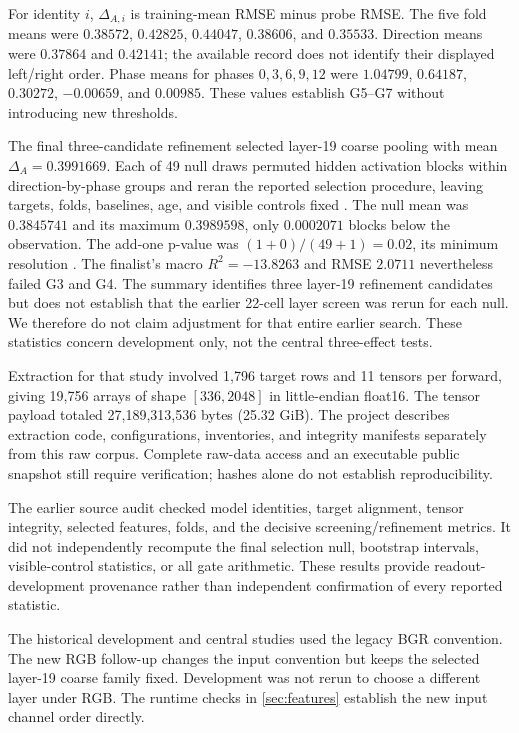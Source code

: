 \documentclass{article}
\begin{document}
For identity $i$, $\Delta_{A,i}$ is training-mean RMSE minus probe RMSE. The five fold means were $0.38572$, $0.42825$, $0.44047$, $0.38606$, and $0.35533$. Direction means were $0.37864$ and $0.42141$; the available record does not identify their displayed left/right order. Phase means for phases $0,3,6,9,12$ were $1.04799$, $0.64187$, $0.30272$, $-0.00659$, and $0.00985$. These values establish G5--G7 without introducing new thresholds.

The final three-candidate refinement selected layer-19 coarse pooling with mean $\Delta_A=0.3991669$. Each of 49 null draws permuted hidden activation blocks within direction-by-phase groups and reran the reported selection procedure, leaving targets, folds, baselines, age, and visible controls fixed \citep{ojala2010permutation}. The null mean was $0.3845741$ and its maximum $0.3989598$, only $0.0002071$ blocks below the observation. The add-one p-value was $(1+0)/(49+1)=0.02$, its minimum resolution \citep{phipson2010permutation}. The finalist's macro $R^2=-13.8263$ and RMSE $2.0711$ nevertheless failed G3 and G4. The summary identifies three layer-19 refinement candidates but does not establish that the earlier 22-cell layer screen was rerun for each null. We therefore do not claim adjustment for that entire earlier search. These statistics concern development only, not the central three-effect tests.

Extraction for that study involved 1,796 target rows and 11 tensors per forward, giving 19,756 arrays of shape $[336,2048]$ in little-endian float16. The tensor payload totaled 27,189,313,536 bytes (25.32 GiB). The project describes extraction code, configurations, inventories, and integrity manifests separately from this raw corpus. Complete raw-data access and an executable public snapshot still require verification; hashes alone do not establish reproducibility.

The earlier source audit checked model identities, target alignment, tensor integrity, selected features, folds, and the decisive screening/refinement metrics. It did not independently recompute the final selection null, bootstrap intervals, visible-control statistics, or all gate arithmetic. These results provide readout-development provenance rather than independent confirmation of every reported statistic.

The historical development and central studies used the legacy BGR convention. The new RGB follow-up changes the input convention but keeps the selected layer-19 coarse family fixed. Development was not rerun to choose a different layer under RGB. The runtime checks in \autoref{sec:features} establish the new input channel order directly.
\end{document}
